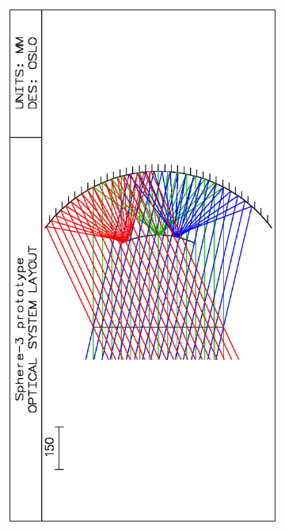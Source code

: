 \documentclass[a4paper]{jpconf}
\begin{document}
\begin{figure}[t]
\begin{subfigure}[b]{0.53\textwidth}
    \includegraphics[height=.37\textheight, angle=-90]{Sphere3optic.eps}

\end{subfigure}
\end{figure}
\end{document}
